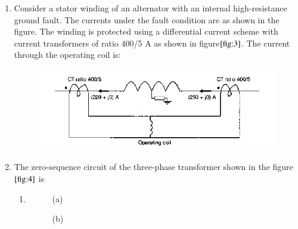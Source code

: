 \documentclass[journal]{IEEEtran}
\numberwithin{equation}{enumi}
\numberwithin{figure}{enumi}
\begin{document}
\begin{enumerate}
    \item Consider a stator winding of an alternator with an internal high-resistance ground fault. The currents under the fault condition are as shown in the figure. The winding is protected using a differential current scheme with current transformers of ratio 400/5 A as shown in figure$\ref{fig:3}$. The current through the operating coil is:
    \begin{figure}[!ht]
    \centering
    \includegraphics[width=\linewidth]{figs/19.png}
    \caption{}
    \label{fig:3}
    \end{figure}
    \begin{enumerate}
    \end{enumerate}
 \item   The zero-sequence circuit of the three-phase transformer shown in the figure$\ref{fig:4}$ is

\begin{figure}[!ht]
    
			\centering
			
			\caption{}
			\label{fig:4}
		\end{figure}
\begin{enumerate}

    \item[]

    \begin{figure}[H]
        \centering

        \begin{minipage}{0.45\linewidth}
            \centering
            
            \caption*{(a)}
        \end{minipage}%
        \hfill
        \begin{minipage}{0.45\linewidth}
            \centering
            
            \caption*{(b)}
        \end{minipage}


\end{figure}
\end{enumerate}
\end{enumerate}
\end{document}

